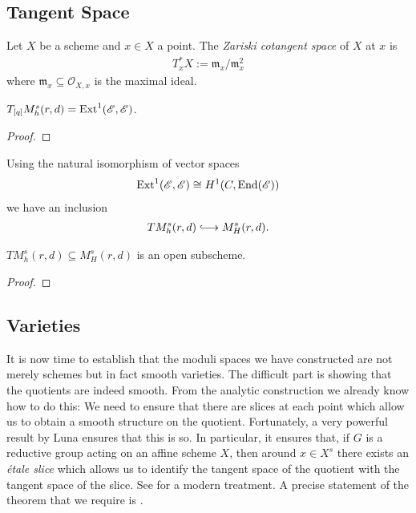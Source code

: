 \documentclass[12pt]{ociamthesis}  %
\begin{document}
\subsection{Tangent Space}

\begin{definition}
  Let $X$ be a scheme and $x\in X$ a point. The \emph{Zariski cotangent
    space} of $X$ at $x$ is
  \begin{align*}
    T_x^* X := \mathfrak m_x /\mathfrak m_x^2
  \end{align*}
  where $\mathfrak m_x\subseteq\mathscr O_{X,x}$ is the maximal ideal.
\end{definition}

\begin{theorem}
  $T_{[q]} M^s_h(r,d) = \operatorname{Ext}^1(\mathscr E,\mathscr E)$.
  \begin{proof}
    \missingproof
  \end{proof}
\end{theorem}

Using the natural isomorphism of vector spaces
\begin{align*}
  \operatorname{Ext}^1(\mathscr E,\mathscr E) \cong H^1(C,\operatorname{End}(\mathscr E))
\end{align*}
we have an inclusion
\begin{align*}
  TM^s_h(r,d) \longinc M^s_H(r,d).
\end{align*}

\begin{corollary}\label{thm:cotangent_is_open}
  $TM^s_h(r,d)\subseteq M^s_H(r,d)$ is an open subscheme.
  \begin{proof}
    \missingproof
  \end{proof}
\end{corollary}

\subsection{Varieties}

It is now time to establish that the moduli spaces we have constructed
are not merely schemes but in fact smooth varieties. The difficult
part is showing that the quotients are indeed smooth. From the analytic
construction we already know how to do this: We need to ensure that
there are slices at each point which allow us to obtain a smooth
structure on the quotient. Fortunately, a very powerful result by
Luna \cite[97]{luna1973} ensures that this is so. In particular, it
ensures that, if $G$ is a reductive group acting on an affine scheme
$X$, then around $x\in X^s$ there exists an \emph{\'etale slice}
which allows us to identify the tangent space of the quotient with
the tangent space of the slice. See \cite{drezet2004} for a modern
treatment. A precise statement of the theorem that we require is
\cite[Theorem 4.2.12]{huybrechts2010}.
\end{document}
